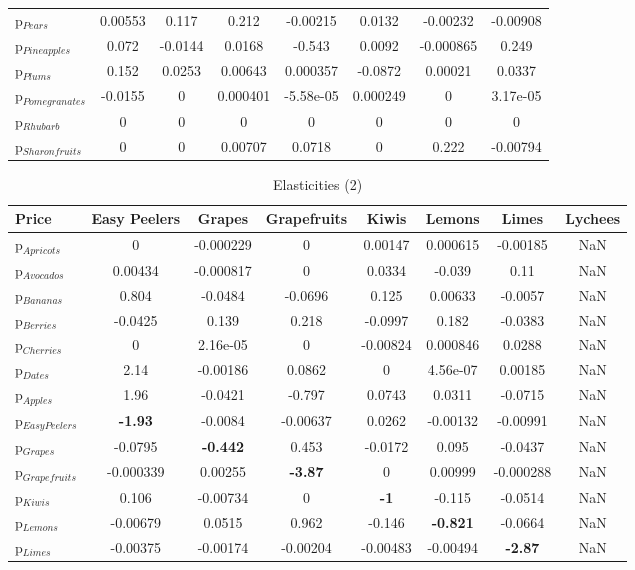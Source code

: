 \documentclass[11pt]{article}
\begin{document}
\begin{table}[h]
\begin{center}
\begin{tabular}{lccccccc}
p$_{Pears}$ &0.00553 &0.117 &0.212 &-0.00215 &0.0132 &-0.00232 &-0.00908 \\
p$_{Pineapples}$ &0.072 &-0.0144 &0.0168 &-0.543 &0.0092 &-0.000865 &0.249 \\
p$_{Plums}$ &0.152 &0.0253 &0.00643 &0.000357 &-0.0872 &0.00021 &0.0337 \\
p$_{Pomegranates}$ &-0.0155 &0 &0.000401 &-5.58e-05 &0.000249 &0 &3.17e-05 \\
p$_{Rhubarb}$ &0 &0 &0 &0 &0 &0 &0 \\
p$_{Sharon fruits}$ &0 &0 &0.00707 &0.0718 &0 &0.222 &-0.00794 \\
\end{tabular}
\end{center}
\end{table}
\begin{table}[h]
\caption{Elasticities (2)}
\label{table:elasticities 2}
\begin{center}
\begin{tabular}{lccccccc} \hline \hline
Price &Easy Peelers &Grapes &Grapefruits &Kiwis &Lemons &Limes &Lychees \\ \hline
p$_{Apricots}$ &0 &-0.000229 &0 &0.00147 &0.000615 &-0.00185 &NaN \\
p$_{Avocados}$ &0.00434 &-0.000817 &0 &0.0334 &-0.039 &0.11 &NaN \\
p$_{Bananas}$ &0.804 &-0.0484 &-0.0696 &0.125 &0.00633 &-0.0057 &NaN \\
p$_{Berries}$ &-0.0425 &0.139 &0.218 &-0.0997 &0.182 &-0.0383 &NaN \\
p$_{Cherries}$ &0 &2.16e-05 &0 &-0.00824 &0.000846 &0.0288 &NaN \\
p$_{Dates}$ &2.14 &-0.00186 &0.0862 &0 &4.56e-07 &0.00185 &NaN \\
p$_{Apples}$ &1.96 &-0.0421 &-0.797 &0.0743 &0.0311 &-0.0715 &NaN \\
p$_{Easy Peelers}$ &\textbf{-1.93} &-0.0084 &-0.00637 &0.0262 &-0.00132 &-0.00991 &NaN \\
p$_{Grapes}$ &-0.0795 &\textbf{-0.442} &0.453 &-0.0172 &0.095 &-0.0437 &NaN \\
p$_{Grapefruits}$ &-0.000339 &0.00255 &\textbf{-3.87} &0 &0.00999 &-0.000288 &NaN \\
p$_{Kiwis}$ &0.106 &-0.00734 &0 &\textbf{-1} &-0.115 &-0.0514 &NaN \\
p$_{Lemons}$ &-0.00679 &0.0515 &0.962 &-0.146 &\textbf{-0.821} &-0.0664 &NaN \\
p$_{Limes}$ &-0.00375 &-0.00174 &-0.00204 &-0.00483 &-0.00494 &\textbf{-2.87} &NaN \\

\end{tabular}
\end{center}
\end{table}
\end{document}
